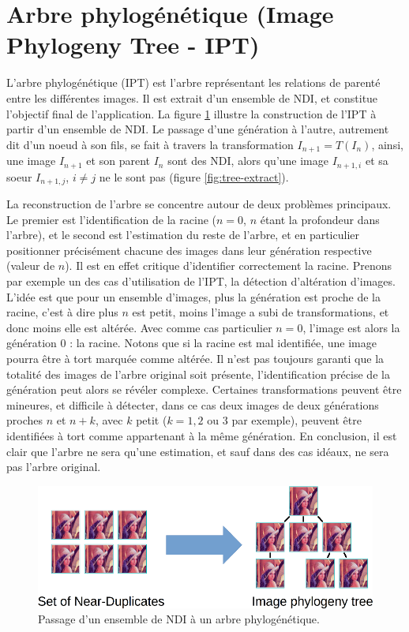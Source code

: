 \documentclass[utf8,final]{stageM2R} %
\begin{document}
\section{Arbre phylogénétique (Image Phylogeny Tree - IPT)}
\label{ipt}
L'arbre phylogénétique (IPT) est l'arbre représentant les relations de parenté entre les différentes images. Il est extrait d'un ensemble de NDI, et constitue l'objectif final de l'application. La figure \ref{fig:set-to-tree} illustre la construction de l'IPT à partir d'un ensemble de NDI. Le passage d'une génération à l'autre, autrement dit d'un noeud à son fils, se fait à travers la transformation $I_{n+1} = T(I_{n})$, ainsi, une image $I_{n+1}$ et son parent $I_{n}$ sont des NDI, alors qu'une image $I_{n+1,i}$ et sa soeur $I_{n+1,j}$, $i \neq j$ ne le sont pas (figure \ref{fig:tree-extract}).

La reconstruction de l'arbre se concentre autour de deux problèmes principaux. Le premier est l'identification de la racine ($n=0$, $n$ étant la profondeur dans l'arbre), et le second est l'estimation du reste de l'arbre, et en particulier positionner précisément chacune des images dans leur génération respective (valeur de $n$). Il est en effet critique d'identifier correctement la racine. Prenons par exemple un des cas d'utilisation de l'IPT, la détection d'altération d'images. L'idée est que pour un ensemble d'images, plus la génération est proche de la racine, c'est à dire plus $n$ est petit, moins l'image a subi de transformations, et donc moins elle est altérée. Avec comme cas particulier $n = 0$, l'image est alors la génération $0$ : la racine. Notons que si la racine est mal identifiée, une image pourra être à tort marquée comme altérée.
Il n'est pas toujours garanti que la totalité des images de l'arbre original soit présente, l'identification précise de la génération peut alors se révéler complexe. Certaines transformations peuvent être mineures, et difficile à détecter, dans ce cas deux images de deux générations proches $n$ et $n+k$, avec $k$ petit ($k = 1, 2$ ou 3 par exemple), peuvent être identifiées à tort comme appartenant à la même génération. En conclusion, il est clair que l'arbre ne sera qu'une estimation, et sauf dans des cas idéaux, ne sera pas l'arbre original.

\begin{figure}
  \begin{center}
    \includegraphics[width=120mm]{images/set_to_tree}
    \caption{Passage d'un ensemble de NDI à un arbre phylogénétique.}
    \label{fig:set-to-tree}
  \end{center}
\end{figure}
\end{document}
